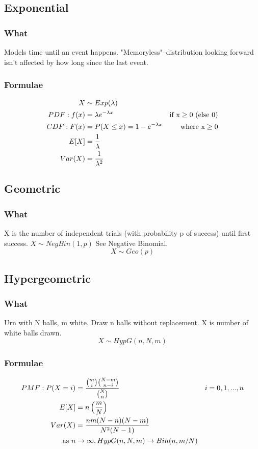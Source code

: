 \documentclass[12pt]{amsart}
\begin{document}
\subsection{Exponential}
\subsubsection{What}
Models time until an event happens. "Memoryless"--distribution looking forward isn't affected by how long since the last event.
\subsubsection{Formulae}
\begin{align*}
X &\sim Exp(\lambda) \\
PDF: f(x) &= \lambda e^{-\lambda x} & \text{if x} \geq 0 \text{ (else 0)} \\
CDF: F(x) &= P(X \leq x) = 1 - e^{-\lambda x} & \text{where x} \geq 0 \\
E[X] &= {1 \over \lambda} \\
Var(X) &= {1 \over \lambda^2}
\end{align*}
%
\subsection{Geometric}
\subsubsection{What}
X is the number of independent trials (with probability p of success) until first success. $X \sim NegBin(1, p)$ See Negative Binomial.
\[
X \sim Geo(p)
\]
%
\subsection{Hypergeometric}
\subsubsection{What}
Urn with N balls, m white. Draw n balls without replacement. X is number of white balls drawn.
\[
X \sim HypG(n, N, m)
\]
\subsubsection{Formulae}
\begin{align*}
PMF: P(X = i) &= { {m \choose i} {N-m \choose n-i} \over {N \choose n}} &i=0,1,...,n \\
E[X] &= n \left( {m \over N} \right) \\
Var(X) &= {nm(N-n)(N-m) \over N^2 (N-1)} \\
\text{as } n &\to \infty, HypG(n, N, m) \to Bin(n, m/N)
\end{align*}
%
\end{document}
